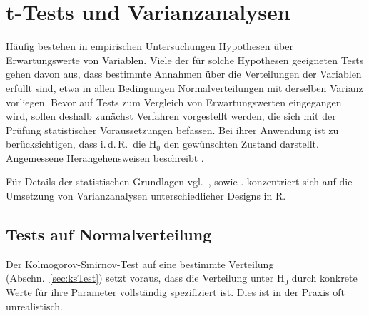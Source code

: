 \chapter[\texorpdfstring{$t$}{t}-Tests und Varianzanalysen]{$\bm{t}$-Tests und Varianzanalysen}
\label{sec:muTests}

Häufig bestehen in empirischen Untersuchungen Hypothesen über Erwartungswerte von Variablen. Viele der für solche Hypothesen geeigneten Tests gehen davon aus, dass bestimmte Annahmen über die Verteilungen der Variablen erfüllt sind, etwa in allen Bedingungen Normalverteilungen mit derselben Varianz vorliegen. Bevor auf Tests zum Vergleich von Erwartungswerten eingegangen wird, sollen deshalb zunächst Verfahren vorgestellt werden, die sich mit der Prüfung statistischer Voraussetzungen befassen. Bei ihrer Anwendung ist zu berücksichtigen, dass i.\,d.\,R.\ die $\text{H}_{0}$ den gewünschten Zustand darstellt. Angemessene Herangehensweisen beschreibt .

Für Details der statistischen Grundlagen vgl.\ ,  sowie .  konzentriert sich auf die Umsetzung von Varianzanalysen unterschiedlicher Designs in R.

\section{Tests auf Normalverteilung}
\label{sec:normalTest}

Der Kolmogorov-Smirnov-Test auf eine bestimmte Verteilung (Abschn.\ \ref{sec:ksTest}) setzt voraus, dass die Verteilung unter $\text{H}_{0}$ durch konkrete Werte für ihre Parameter vollständig spezifiziert ist. Dies ist in der Praxis oft unrealistisch.

